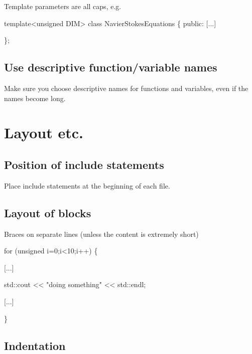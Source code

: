 \begin{DoxyItemize}
\item Template parameters are all caps, e.\+g. 
\begin{DoxyCode}
\textcolor{keyword}{template}<\textcolor{keywordtype}{unsigned} DIM>
\textcolor{keyword}{class }NavierStokesEquations
\{
  \textcolor{keyword}{public}:
  [...]

\};
\end{DoxyCode}

\end{DoxyItemize}\hypertarget{index_verbose}{}\subsection{Use descriptive function/variable names}\label{index_verbose}

\begin{DoxyItemize}
\item Make sure you choose descriptive names for functions and variables, even if the names become long.
\end{DoxyItemize}



 

\hypertarget{index_layout}{}\section{Layout etc.}\label{index_layout}
\hypertarget{index_include_files}{}\subsection{Position of include statements}\label{index_include_files}

\begin{DoxyItemize}
\item Place include statements at the beginning of each file.
\end{DoxyItemize}\hypertarget{index_layout_blocks}{}\subsection{Layout of blocks}\label{index_layout_blocks}

\begin{DoxyItemize}
\item Braces on separate lines (unless the content is extremely short) 
\begin{DoxyCode}
\textcolor{keywordflow}{for} (\textcolor{keywordtype}{unsigned} i=0;i<10;i++)
  \{

   [...]

   std::cout << \textcolor{stringliteral}{"doing something"} << std::endl;

   [...]

  \}
\end{DoxyCode}

\end{DoxyItemize}\hypertarget{index_indentation}{}\subsection{Indentation}\label{index_indentation}

